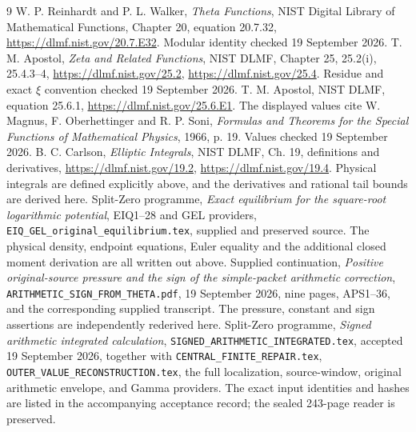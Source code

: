 \documentclass[11pt]{article}
\begin{document}
\begin{thebibliography}{9}
 W. P. Reinhardt and P. L. Walker,
\emph{Theta Functions}, NIST Digital Library of Mathematical Functions,
Chapter 20, equation 20.7.32,
\url{https://dlmf.nist.gov/20.7.E32}. Modular identity checked 19 September 2026.
 T. M. Apostol, \emph{Zeta and Related Functions}, NIST DLMF,
Chapter 25, 25.2(i), 25.4.3--4,
\url{https://dlmf.nist.gov/25.2}, \url{https://dlmf.nist.gov/25.4}.
Residue and exact $\xi$ convention checked 19 September 2026.
 T. M. Apostol, NIST DLMF, equation 25.6.1,
\url{https://dlmf.nist.gov/25.6.E1}. The displayed values cite
W. Magnus, F. Oberhettinger and R. P. Soni,
\emph{Formulas and Theorems for the Special Functions of Mathematical Physics},
1966, p. 19. Values checked 19 September 2026.
 B. C. Carlson, \emph{Elliptic Integrals}, NIST DLMF,
Ch. 19, definitions and derivatives, \url{https://dlmf.nist.gov/19.2},
\url{https://dlmf.nist.gov/19.4}. Physical integrals are defined explicitly
above, and the derivatives and rational tail bounds are derived here.
 Split-Zero programme, \emph{Exact equilibrium for the
square-root logarithmic potential}, EIQ1--28 and GEL providers,
\texttt{EIQ\_GEL\_original\_equilibrium.tex}, supplied and preserved source.
The physical density, endpoint equations, Euler equality and the
additional closed moment derivation are all written out above.
 Supplied continuation, \emph{Positive original-source
pressure and the sign of the simple-packet arithmetic correction},
\texttt{ARITHMETIC\_SIGN\_FROM\_THETA.pdf}, 19 September 2026, nine pages,
APS1--36, and the corresponding supplied transcript. The pressure,
constant and sign assertions are independently rederived here.
 Split-Zero programme, \emph{Signed arithmetic integrated
calculation}, \texttt{SIGNED\_ARITHMETIC\_INTEGRATED.tex}, accepted
19 September 2026, together with \texttt{CENTRAL\_FINITE\_REPAIR.tex},
\texttt{OUTER\_VALUE\_RECONSTRUCTION.tex}, the full localization, source-window,
original arithmetic envelope, and Gamma providers. The exact input
identities and hashes are listed in the accompanying acceptance record;
the sealed 243-page reader is preserved.
\end{thebibliography}
\end{document}
